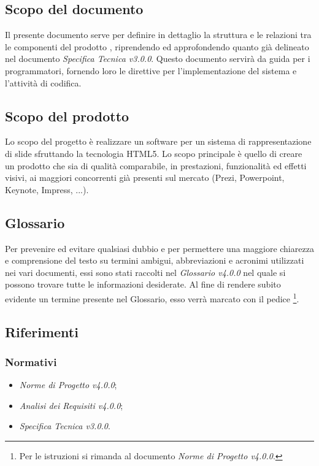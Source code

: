 \subsection{Scopo del documento}
  Il presente documento serve per definire in dettaglio la struttura e le relazioni tra le componenti del prodotto \PROGETTO{}, riprendendo ed approfondendo 
  quanto già delineato nel documento \textit{Specifica Tecnica v3.0.0}. Questo documento servirà da guida per i programmatori, fornendo loro le direttive 
  per l'implementazione del sistema e l'attività di codifica.
\subsection{Scopo del prodotto}
  Lo scopo del progetto è realizzare un software per un sistema di rappresentazione di \gls{slide} sfruttando la tecnologia \gls{HTML5}. 
  Lo scopo principale è quello di creare un prodotto che sia di qualità comparabile, in prestazioni, funzionalità ed effetti visivi, 
  ai maggiori concorrenti già presenti sul mercato (Prezi, Powerpoint, Keynote, Impress, ...).
\subsection{Glossario}
Per prevenire ed evitare qualsiasi dubbio e per permettere una maggiore chiarezza e comprensione del testo su termini ambigui, abbreviazioni e acronimi 
utilizzati nei vari documenti, essi sono stati raccolti nel \textit{Glossario v4.0.0} nel quale si possono trovare tutte le informazioni desiderate.
Al fine di rendere subito evidente un termine presente nel Glossario, esso verrà marcato con il pedice \G\footnote{Per le istruzioni si rimanda al documento \textit{Norme di Progetto v4.0.0}.}.
\subsection{Riferimenti}
  \subsubsection{Normativi}
      \begin{itemize}
       \item \textit{Norme di Progetto v4.0.0};
       \item \textit{Analisi dei Requisiti v4.0.0};
       \item \textit{Specifica Tecnica v3.0.0}.
      \end{itemize}
